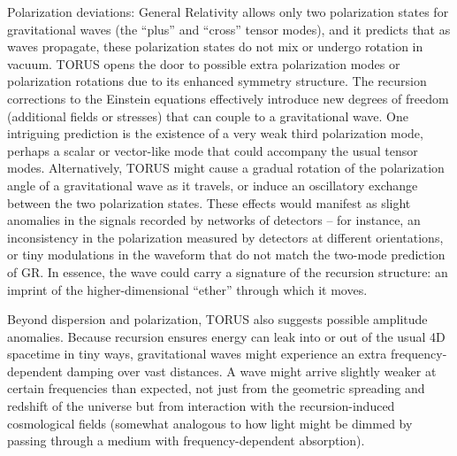 \documentclass[
]{article}
\begin{document}
Polarization deviations: General Relativity allows only two polarization
states for gravitational waves (the ``plus'' and ``cross'' tensor
modes), and it predicts that as waves propagate, these polarization
states do not mix or undergo rotation in vacuum. TORUS opens the door to
possible extra polarization modes or polarization rotations due to its
enhanced symmetry structure. The recursion corrections to the Einstein
equations effectively introduce new degrees of freedom (additional
fields or stresses) that can couple to a gravitational wave. One
intriguing prediction is the existence of a very weak third polarization
mode, perhaps a scalar or vector-like mode that could accompany the
usual tensor modes. Alternatively, TORUS might cause a gradual rotation
of the polarization angle of a gravitational wave as it travels, or
induce an oscillatory exchange between the two polarization states.
These effects would manifest as slight anomalies in the signals recorded
by networks of detectors -- for instance, an inconsistency in the
polarization measured by detectors at different orientations, or tiny
modulations in the waveform that do not match the two-mode prediction of
GR. In essence, the wave could carry a signature of the recursion
structure: an imprint of the higher-dimensional ``ether'' through which
it moves.

Beyond dispersion and polarization, TORUS also suggests possible
amplitude anomalies. Because recursion ensures energy can leak into or
out of the usual 4D spacetime in tiny ways, gravitational waves might
experience an extra frequency-dependent damping over vast distances. A
wave might arrive slightly weaker at certain frequencies than expected,
not just from the geometric spreading and redshift of the universe but
from interaction with the recursion-induced cosmological fields
(somewhat analogous to how light might be dimmed by passing through a
medium with frequency-dependent absorption).
\end{document}
